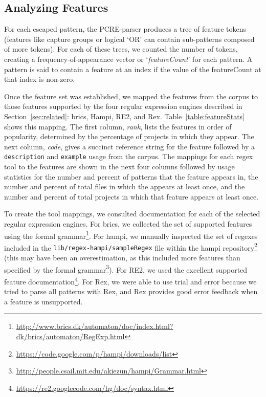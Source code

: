 \subsection{Analyzing Features}
\label{study:features}
For each escaped pattern, the PCRE-parser produces a tree of feature tokens (features like capture groups or logical `OR' can contain sub-patterns composed of more tokens).  For each of these trees, we counted the number of tokens, creating a frequency-of-appearance vector or `\emph{featureCount}' for each pattern.  A pattern is said to contain a feature at an index if the value of the featureCount at that index is non-zero.  

Once the feature set was established, we mapped the features from the corpus to those features supported by the four regular expression engines described in Section~\ref{sec:related}: brics, Hampi, RE2, and Rex.
Table~\ref{table:featureStats} shows this mapping.
The first column, \emph{rank}, lists the features in order of popularity, determined by the percentage of projects in which they appear. The next column, \emph{code}, gives a succinct reference string for the feature followed by a {\tt description} and {\tt example} usage from the corpus. The mappings for each regex tool to the features are shown in the next four columns followed by usage statistics for the number and percent of patterns that the feature appears in, the number and percent of total files in which the appears at least once, and the number and percent of total projects in which that feature appears at least once.

To create the tool mappings, we consulted documentation for each of the selected regular expression engines. For brics, we collected the set of supported features using the formal grammar\footnote{\url{http://www.brics.dk/automaton/doc/index.html?dk/brics/automaton/RegExp.html}}.  For hampi, we manually inspected the set of regexes included in the {\tt lib/regex-hampi/sampleRegex} file within the hampi repository\footnote{\url{https://code.google.com/p/hampi/downloads/list}} (this may have been an overestimation, as this included more features than specified by the formal grammar\footnote{\url{http://people.csail.mit.edu/akiezun/hampi/Grammar.html}}).  For RE2, we used the excellent supported feature documentation\footnote{\url{https://re2.googlecode.com/hg/doc/syntax.html}}.  For Rex, we were able to use trial and error because we tried to parse all patterns with Rex, and Rex provides good error feedback when a feature is unsupported.

